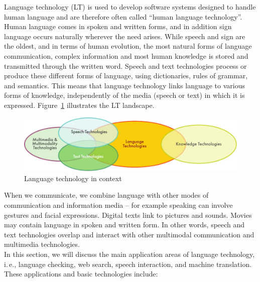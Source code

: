 \clearpage


\begin{multicols}{2}

Language technology (LT) is used to develop software systems designed
to handle human language and are therefore often called ``human
language technology''. Human language comes in spoken and written
forms, and in addition sign language occurs naturally wherever the
need arises. While speech and sign are the oldest, and in terms of
human evolution, the most natural forms of language communication,
complex information and most human knowledge is stored and transmitted
through the written word. Speech and text technologies process or
produce these different forms of language, using dictionaries, rules
of grammar, and semantics. This means that language technology links
language to various forms of knowledge, independently of the media
(speech or text) in which it is
expressed. Figure~\ref{fig:ltincontext_en} illustrates the LT
landscape.

\begin{figure}[htb]
  \center
  \includegraphics[width=\textwidth]{../_media/english/language_technologies}
  \caption{Language technology in context}
  \label{fig:ltincontext_en}
\end{figure}

When we communicate, we combine language with other modes of communication and information media -- for example speaking can involve gestures and facial expressions. Digital texts link to pictures and sounds. Movies may contain language in spoken and written form. In other words, speech and text technologies overlap and interact with other multimodal communication and multimedia technologies.\\ 
In this section, we will discuss the main application areas of language technology, i.\,e., language checking, web search, speech interaction, and machine translation. These applications and basic technologies include: 


\end{multicols}
